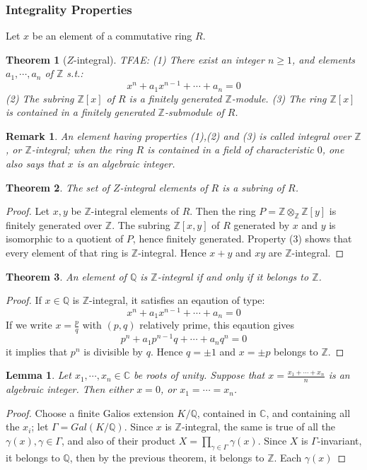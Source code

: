 \documentclass{article}
\newtheorem{Thm}{Theorem}[section]
\newtheorem{Lem}{Lemma}[section]
\newtheorem*{Rk}{Remark}
\theoremstyle{definition}
\begin{document}
\subsubsection{Integrality Properties}
Let $x$ be an element of a commutative ring $R$.
\begin{Thm}[$Z$-integral]
    TFAE:\newline 
(1) There exist an integer $n\ge 1$, and elements $a_1,\cdots,a_n$ of $\mathbb{Z}$ s.t.:\[x^n+a_1x^{n-1}+\cdots+a_n=0\]
(2) The subring $\mathbb{Z}[x]$ of $R$ is a finitely generated $\mathbb{Z}$-module.\newline
(3) The ring $\mathbb{Z}[x]$ is contained in a finitely generated $\mathbb{Z}$-submodule of $R$.
\end{Thm}
\begin{Rk}
    An element having properties (1),(2) and (3) is called integral over $\mathbb{Z}$, or $\mathbb{Z}$-integral;
    when the ring $R$ is contained in a field of characteristic $0$, one also says that $x$ is an algebraic integer.
\end{Rk}
\begin{Thm}
    The set of $Z$-integral elements of $R$ is a subring of $R$.
\end{Thm}
\begin{proof}
    Let $x,y$ be $\mathbb{Z}$-integral elements of $R$. Then the ring $P=\mathbb{Z}\otimes_{\mathbb{Z}}\mathbb{Z}[y]$ is finitely generated over $\mathbb{Z}$.
    The subring $\mathbb{Z}[x,y]$ of $R$ generated by $x$ and $y$ is isomorphic to a quotient of $P$, hence finitely generated. Property (3) shows that every element
of that ring is $\mathbb{Z}$-integral. Hence $x+y$ and $xy$ are $\mathbb{Z}$-integral.
\end{proof}
\begin{Thm}
    An element of $\mathbb{Q}$ is $\mathbb{Z}$-integral if and only if it belongs to $\mathbb{Z}$.
\end{Thm}
\begin{proof}
    If $x\in\mathbb{Q}$ is $\mathbb{Z}$-integral, it satisfies an eqaution of type: \[x^n+a_1x^{n-1}+\cdots+a_n=0\]
    If we write $x=\frac{p}{q}$ with $(p,q)$ relatively prime, this eqaution gives \[p^n+a_1p^{n-1}q+\cdots+a_nq^n=0\]
    it implies that $p^n$ is divisible by $q$. Hence $q=\pm 1$ and $x=\pm p$ belongs to $\mathbb{Z}$.
\end{proof}
\begin{Lem}
    Let $x_1,\cdots,x_n\in\mathbb{C}$ be roots of unity. Suppose that $x=\frac{x_1+\cdots+x_n}{n}$ is an algebraic integer. Then either $x=0$, or $x_1=\cdots=x_n$.
\end{Lem}
\begin{proof}
    Choose a finite Galios extension $K/\mathbb{Q}$, contained in $\mathbb{C}$, and containing all the $x_i$; let $\Gamma=Gal(K/\mathbb{Q})$. Since $x$ is $\mathbb{Z}$-integral,
the same is true of all the $\gamma(x),\gamma\in\Gamma$, and also of their product $X=\prod_{\gamma\in\Gamma}\gamma(x)$. Since $X$ is $\Gamma$-invariant, it belongs to $\mathbb{Q}$,
then by the previous theorem, it belongs to $\mathbb{Z}$. Each $\gamma(x)$
\end{proof}
\end{document}

